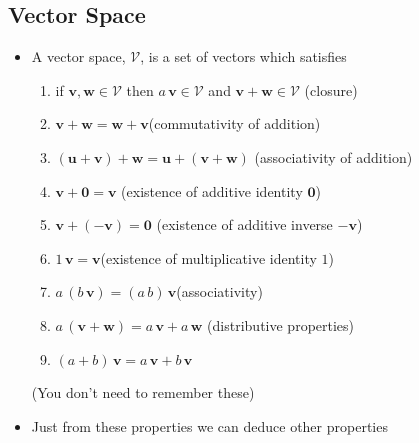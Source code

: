 \begin{slide}
\section[-1]{Vector Space}

\begin{PauseHighLight}
  \begin{itemize}
  \item A vector space, $\mathcal{V}$, is a set of vectors which satisfies
    \begin{enumerate}\squeeze
    \item if $\bm{v}, \bm{w}\in\mathcal{V}$ then
      $a\,\bm{v}\in\mathcal{V}$ and $\bm{v}+\bm{w}\in\mathcal{V}$\hfill
      (closure)\pause 
    \item $\bm{v} + \bm{w} = \bm{w} + \bm{v}$\hfill (commutativity of
      addition)\pause 
    \item $(\bm{u}+\bm{v}) + \bm{w} = \bm{u} + (\bm{v} + \bm{w})$\hfill
      (associativity of addition)\pause
    \item $\bm{v} + \bm{0} = \bm{v}$ \hfill(existence of additive identity
      $\bm{0}$)\pause
    \item $\bm{v} + (-\bm{v}) = \bm{0}$ \hfill(existence of additive
      inverse $-\bm{v}$)\pause
    \item $1 \, \bm{v} = \bm{v}$\hfill (existence of multiplicative identity
      $1$)\pause
    \item $a\,(b\,\bm{v}) = (a\,b)\,\bm{v}$\hfill (associativity)
    \item $a\,(\bm{v} + \bm{w}) = a\,\bm{v} + a\,\bm{w}$\hfill
      (distributive properties)
    \item $(a+b)\,\bm{v} = a\,\bm{v} + b\,\bm{v}$\pause
    \end{enumerate}
    (You don't need to remember these)\pause
  \item Just from these properties we can deduce other properties\pause
  \end{itemize}
\end{PauseHighLight}


\end{slide}


